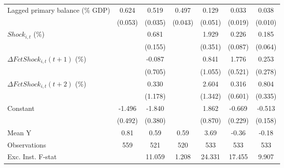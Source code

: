 {\begin{tabular}{l*{6}{c}}
\addlinespace
Lagged primary balance (\% GDP)&       0.624\sym{***}&       0.519\sym{***}&       0.497\sym{***}&       0.129\sym{**} &       0.033\sym{*}  &       0.038\sym{***}\\
                    &     (0.053)         &     (0.035)         &     (0.043)         &     (0.051)         &     (0.019)         &     (0.010)         \\
\addlinespace
$ Shock_{i,t}$ (\%) &                     &       0.681\sym{***}&                     &       1.929\sym{***}&       0.226\sym{**} &       0.185\sym{***}\\
                    &                     &     (0.155)         &                     &     (0.351)         &     (0.087)         &     (0.064)         \\
\addlinespace
$ \Delta FctShock_{i,t}(t+1)$ (\%)&                     &      -0.087         &                     &       0.841         &       1.776\sym{***}&       0.253         \\
                    &                     &     (0.705)         &                     &     (1.055)         &     (0.521)         &     (0.278)         \\
\addlinespace
$ \Delta FctShock_{i,t}(t+2)$ (\%)&                     &       0.330         &                     &       2.604\sym{*}  &       0.316         &       0.804\sym{**} \\
                    &                     &     (1.178)         &                     &     (1.342)         &     (0.601)         &     (0.335)         \\
\addlinespace
Constant            &      -1.496\sym{***}&      -1.840\sym{***}&                     &       1.862\sym{**} &      -0.669\sym{***}&      -0.513\sym{***}\\
                    &     (0.492)         &     (0.380)         &                     &     (0.870)         &     (0.229)         &     (0.158)         \\
\midrule
Mean Y              &        0.81         &        0.59         &        0.59         &        3.69         &       -0.36         &       -0.18         \\
Observations        &         559         &         521         &         520         &         533         &         533         &         533         \\
Exc. Inst. F-stat   &                     &      11.059         &       1.208         &      24.331         &      17.455         &       9.907         \\
\bottomrule
\end{tabular}
}
